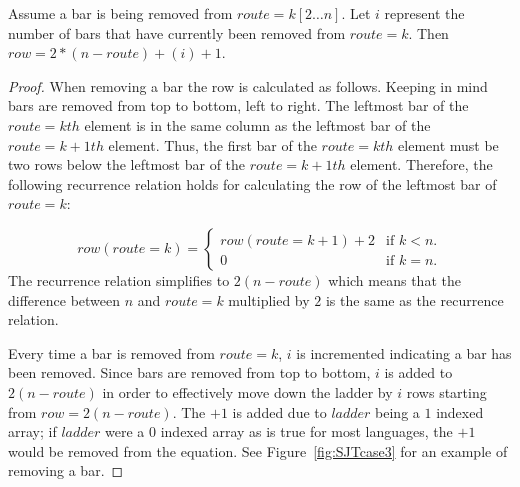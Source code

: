 

\begin{lemma}
  Assume a bar is being removed from $route=k[2 \dots n]$. 
  Let $i$ represent the number of bars that have currently been removed from $route=k$. 
  Then $row=2*(n-route) + (i)+1$.
\end{lemma}
\begin{proof}
  When removing a bar the row is calculated as follows. Keeping in mind bars are removed from top to bottom, left to right.
  The leftmost bar of the $route=kth$ element is in the same column as the leftmost bar of the $route=k+1th$ element.
  Thus, the first bar of the $route=kth$ element must be two rows below the leftmost bar 
  of the $route=k+1th$ element. Therefore, the following recurrence relation holds for calculating the row of the leftmost bar of $route=k$:
  
\begin{equation}
  row(route=k)=\begin{cases}
    row(route=k+1)+2 & \text{if $k<n$}.\\
    0 & \text{if $k=n$}.
  \end{cases}
\end{equation}
The recurrence relation simplifies to $2(n-route)$ which means that the difference between $n$ and $route=k$ 
multiplied by $2$ is the same as the recurrence relation.\par 
Every time a bar is removed from $route=k$, $i$ is incremented indicating a bar has been removed. 
Since bars are removed from top to bottom, $i$ is added to $2(n-route)$ in order to effectively move 
down the ladder by $i$ rows starting from $row=2(n-route)$. The $+1$ is added due to $ladder$ being a 
$1$ indexed array; if $ladder$ were a $0$ indexed array as is true for most languages, the $+1$
would be removed from the equation.
See Figure~\ref{fig:SJTcase3} for an example of removing a bar.\pagebreak
\end{proof}

